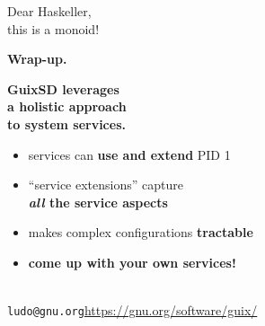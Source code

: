 \documentclass{beamer}
\newcommand{\highlight}[1]{\alert{\textbf{#1}}}
\begin{document}
\begin{frame}[plain]
  \Huge{Dear Haskeller,\\
    this is a monoid!}
\end{frame}


\begin{frame}
  \Huge{\textbf{Wrap-up.}}
\end{frame}

\begin{frame}[plain]
  \Huge{\textbf{GuixSD leverages\\
      a holistic approach\\
      to system services.}}
\end{frame}

\begin{frame}[plain]
  \Large{
    \begin{itemize}
    \item services can \highlight{use and extend} PID 1
    \item ``service extensions'' capture\\
      \highlight{\emph{all} the service aspects}
    \item makes complex configurations \highlight{tractable}
    \item<2-> \textbf{come up with your own services!}
    \end{itemize}
  }
\end{frame}

\begin{frame}[plain]

\vfill{
  \vspace{2.5cm}
  \\[1.0cm]
  \texttt{ludo@gnu.org}\hfill{\alert{\url{https://gnu.org/software/guix/}}}
  \\
}
\end{frame}
\end{document}

